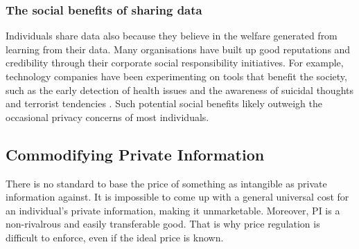 \documentclass{icmmcm}
\begin{document}
\subsubsection*{The social benefits of sharing data} 
Individuals share data also because they believe in the welfare generated from learning from their data. Many organisations have built up good reputations and credibility through their corporate social responsibility initiatives.
For example, technology companies have been experimenting on tools that benefit the society, such as the early detection of health issues \citep{social_health} and the awareness of suicidal thoughts \citep{social_suicide} and terrorist tendencies \citep{social_terrorist}. Such potential social benefits likely outweigh the occasional privacy concerns of most individuals. 


\subsection{Commodifying Private Information}
There is no standard to base the price of something as intangible as private information against. It is impossible to come up with a general universal cost for an individual's private information, making it unmarketable.
Moreover, PI is a non-rivalrous and easily transferable good. That is why price regulation is difficult to enforce, even if the ideal price is known.
\end{document}
